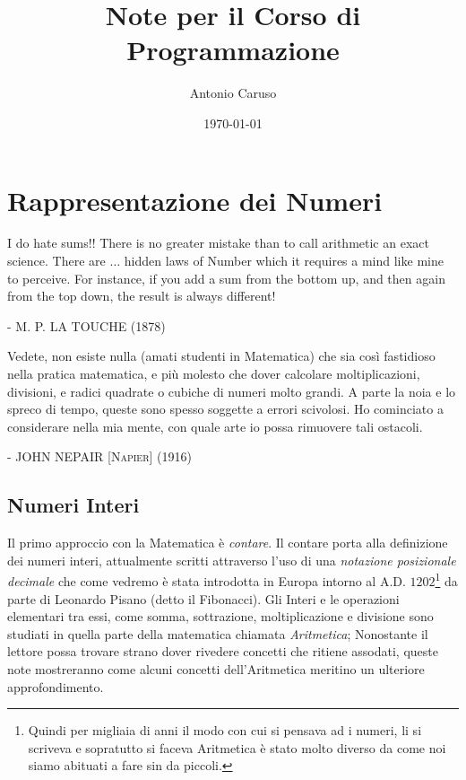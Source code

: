 \documentclass[a4paper]{book}
\title{Note per il Corso di Programmazione}
\author{Antonio Caruso}
\date{\today}
\makeatletter
\renewcommand\maketitle{
\begin{titlepage} \vspace*{\stretch{1}}
 \begin{center} {\Huge \@title \par}%
	 \vspace{5em}%
	 {\LARGE \@author \par}%
	 \vspace{1.5em} {
	 \large \emph{\@date} \par}%
	 \vspace{3em} \end{center}%
 \vspace*{\stretch{1}} 
\end{titlepage}}
\theoremstyle{definition}
\makeatother
\begin{document}
\hypersetup{pageanchor=false}
\frontmatter 
\maketitle
\hypersetup{pageanchor=true} 
\tableofcontents
{} 
\mainmatter



\chapter{Rappresentazione dei Numeri}

\epigraph{I do hate sums!! There is no greater mistake than to call arithmetic
an exact science. There are $\ldots$ hidden laws of Number which it requires a
mind like mine to perceive. For instance, if you add a sum from the bottom up,
and then again from the top down, the result is always different!}{ -
\textsc{M. P. LA TOUCHE} (1878)} 

\epigraph{Vedete, non esiste nulla (amati studenti in Matematica) che sia così
fastidioso nella pratica matematica, e più molesto che dover calcolare
moltiplicazioni, divisioni, e radici quadrate o cubiche di numeri molto grandi.
A parte la noia e lo spreco di tempo, queste sono spesso soggette a errori
scivolosi. Ho cominciato a considerare nella mia mente, con quale arte io possa
rimuovere tali ostacoli.} { - \textsc{JOHN NEPAIR [Napier] (1916)}}

\section[Numeri Interi]{Numeri Interi}

Il primo approccio con la Matematica è \emph{contare}. Il contare porta alla
definizione dei numeri interi, attualmente scritti attraverso l'uso di una
\emph{notazione posizionale decimale} che come vedremo è stata introdotta in
Europa intorno al A.D. $1202$\footnote{Quindi per migliaia di anni il modo con
cui si pensava ad i numeri, li si scriveva e sopratutto si faceva Aritmetica è
stato molto diverso da come noi siamo abituati a fare sin da piccoli.} da parte
di Leonardo Pisano (detto il Fibonacci). Gli Interi e le operazioni elementari
tra essi, come somma, sottrazione, moltiplicazione e divisione sono studiati in
quella parte della matematica chiamata \emph{Aritmetica}; Nonostante il lettore
possa trovare strano dover rivedere concetti che ritiene assodati, queste note
mostreranno come alcuni concetti dell'Aritmetica meritino un ulteriore approfondimento.
\end{document}
